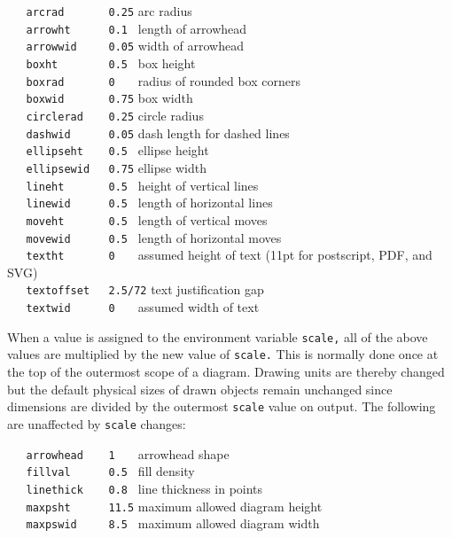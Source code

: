 {\tt \ \ \ arcrad\ \ \ \ \ \ \ 0.25}
   arc radius
\\\hbox{}\hskip-1pt
{\tt \ \ \ arrowht\ \ \ \ \ \ 0.1\ }
    length of arrowhead
\\\hbox{}\hskip-1pt
{\tt \ \ \ arrowwid\ \ \ \ \ 0.05}
   width of arrowhead
\\\hbox{}\hskip-1pt
{\tt \ \ \ boxht\ \ \ \ \ \ \ \ 0.5\ }
    box height
\\\hbox{}\hskip-1pt
{\tt \ \ \ boxrad\ \ \ \ \ \ \ 0\ \ \ }
       radius of rounded box corners
\\\hbox{}\hskip-1pt
{\tt \ \ \ boxwid\ \ \ \ \ \ \ 0.75}
   box width
\\\hbox{}\hskip-1pt
{\tt \ \ \ circlerad\ \ \ \ 0.25}
circle radius
\\\hbox{}\hskip-1pt
{\tt \ \ \ dashwid\ \ \ \ \ \ 0.05}
dash length for dashed lines
\\\hbox{}\hskip-1pt
{\tt \ \ \ ellipseht\ \ \ \ 0.5\ }
ellipse height
\\\hbox{}\hskip-1pt
{\tt \ \ \ ellipsewid\ \ \ 0.75}
ellipse width
\\\hbox{}\hskip-1pt
{\tt \ \ \ lineht\ \ \ \ \ \ \ 0.5\ }
height of vertical lines
\\\hbox{}\hskip-1pt
{\tt \ \ \ linewid\ \ \ \ \ \ 0.5\ }
length of horizontal lines
\\\hbox{}\hskip-1pt
{\tt \ \ \ moveht\ \ \ \ \ \ \ 0.5\ }
length of vertical moves
\\\hbox{}\hskip-1pt
{\tt \ \ \ movewid\ \ \ \ \ \ 0.5\ }
length of horizontal moves
\\\hbox{}\hskip-1pt
{\tt \ \ \ textht\ \ \ \ \ \ \ 0\ \ \ }
assumed height of text (11pt for postscript, PDF, and SVG)
\\\hbox{}\hskip-1pt
{\tt \ \ \ textoffset\ \ \ 2.5/72}
text justification gap
\\\hbox{}\hskip-1pt
{\tt \ \ \ textwid\ \ \ \ \ \ 0\ \ \ }
assumed width of text

When a value is assigned to the environment variable
{\tt scale,}
all of the above values are multiplied by the new value of
{\tt scale.}
This is normally done once at the top of the outermost scope of a diagram.
Drawing units are thereby changed but the default physical sizes of
drawn objects remain unchanged since dimensions are divided by the outermost
{\tt scale}
value on output.
The following are unaffected by
{\tt scale}
changes:

{\tt \ \ \ arrowhead\ \ \ \ 1\ \ \ }
arrowhead shape
\\\hbox{}\hskip-1pt
{\tt \ \ \ fillval\ \ \ \ \ \ 0.5\ }
fill density
\\\hbox{}\hskip-1pt
{\tt \ \ \ linethick\ \ \ \ 0.8\ }
line thickness in points
\\\hbox{}\hskip-1pt
{\tt \ \ \ maxpsht\ \ \ \ \ \ 11.5}
maximum allowed diagram height
\\\hbox{}\hskip-1pt
{\tt \ \ \ maxpswid\ \ \ \ \ 8.5\ }
maximum allowed diagram width

